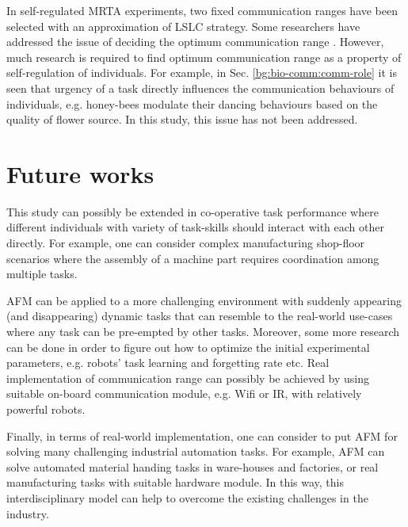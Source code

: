 In self-regulated MRTA experiments, two fixed communication ranges  have been selected with an approximation of LSLC strategy. Some researchers have addressed the issue of deciding the optimum communication range \cite{Yoshida+2000}. However, much research is required to find optimum communication range as a property of self-regulation of individuals. For example, in Sec. \ref{bg:bio-comm:comm-role}  it is seen that urgency of a task directly influences the communication behaviours of individuals, e.g. honey-bees modulate their dancing behaviours based on the quality of flower source. In this study, this issue has not been addressed.

\section{Future works}
This study can possibly be extended in co-operative task performance where different individuals with variety of task-skills should interact with each other directly. For example,  one can consider complex manufacturing shop-floor scenarios where the assembly of a machine part requires coordination among multiple tasks. 

AFM can be applied to a more challenging environment with suddenly appearing (and disappearing) dynamic tasks that can resemble to the real-world use-cases where any task can be pre-empted by other tasks. Moreover, some more research can be done in order to figure out how to optimize the initial experimental parameters, e.g. robots' task learning and forgetting rate etc. Real implementation of communication range can possibly be achieved by using suitable on-board communication module, e.g. Wifi or IR, with  relatively powerful robots.

Finally, in terms of real-world implementation, one can consider to put AFM for solving many challenging industrial automation tasks. For example, AFM can solve automated material handing tasks in ware-houses and factories, or real manufacturing tasks with suitable hardware module. In this way, this interdisciplinary model can help to overcome the existing challenges in the industry.